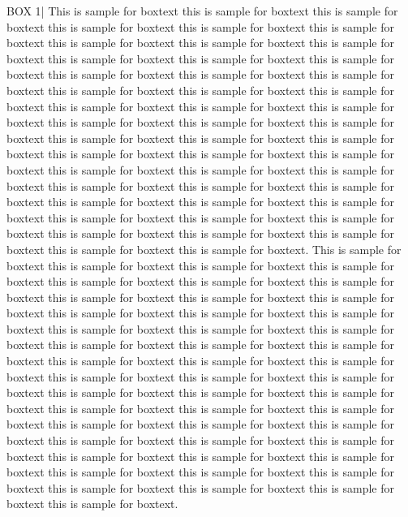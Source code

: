 \documentclass[ASNA,twocolumn]{USG} %
\begin{document}
{\begin{boxwithhead}
{BOX 1\quad|}
{\noindent This is sample for boxtext this is sample for boxtext this is sample for boxtext this is sample for boxtext this is sample for boxtext this is sample for boxtext this is sample for boxtext this is sample for boxtext this is sample for boxtext this is sample for boxtext this is sample for boxtext this is sample for boxtext this is sample for boxtext this is sample for boxtext this is sample for boxtext this is sample for boxtext this is sample for boxtext this is sample for boxtext this is sample for boxtext this is sample for boxtext this is sample for boxtext this is sample for boxtext this is sample for boxtext this is sample for boxtext this is sample for boxtext this is sample for boxtext this is sample for boxtext this is sample for boxtext this is sample for boxtext this is sample for boxtext this is sample for boxtext this is sample for boxtext this is sample for boxtext this is sample for boxtext this is sample for boxtext this is sample for boxtext this is sample for boxtext this is sample for boxtext this is sample for boxtext this is sample for boxtext this is sample for boxtext this is sample for boxtext this is sample for boxtext this is sample for boxtext this is sample for boxtext this is sample for boxtext this is sample for boxtext. This is sample for boxtext this is sample for boxtext this is sample for boxtext this is sample for boxtext this is sample for boxtext this is sample for boxtext this is sample for boxtext this is sample for boxtext this is sample for boxtext this is sample for boxtext this is sample for boxtext this is sample for boxtext this is sample for boxtext this is sample for boxtext this is sample for boxtext this is sample for boxtext this is sample for boxtext this is sample for boxtext this is sample for boxtext this is sample for boxtext this is sample for boxtext this is sample for boxtext this is sample for boxtext this is sample for boxtext this is sample for boxtext this is sample for boxtext this is sample for boxtext this is sample for boxtext this is sample for boxtext this is sample for boxtext this is sample for boxtext this is sample for boxtext this is sample for boxtext this is sample for boxtext this is sample for boxtext this is sample for boxtext this is sample for boxtext this is sample for boxtext this is sample for boxtext this is sample for boxtext this is sample for boxtext this is sample for boxtext this is sample for boxtext this is sample for boxtext this is sample for boxtext this is sample for boxtext this is sample for boxtext.}
\end{boxwithhead}


}
\end{document}

